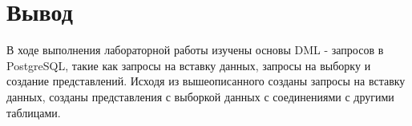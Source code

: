 \documentclass[a4paper,14pt]{extarticle}
\begin{document}
  \section*{Вывод}
  В ходе выполнения лабораторной работы изучены основы DML - запросов в PostgreSQL, такие как запросы на вставку данных, запросы на выборку и создание представлений. Исходя из вышеописанного созданы запросы на вставку данных, созданы представления с выборкой данных с соединениями с другими таблицами.
\end{document}
